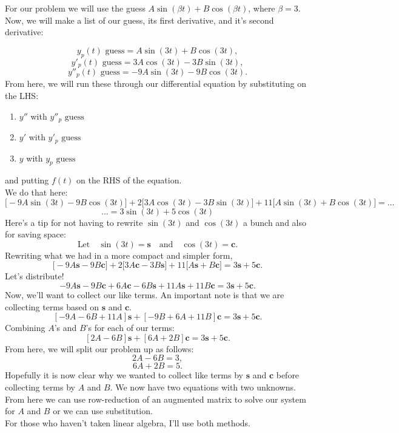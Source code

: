 \documentclass[a4paper,12pt]{article} %
\begin{document}
For our problem we will use the guess $A\sin(\beta t) + B\cos(\beta t)$, where $\beta = 3.$\\
Now, we will make a list of our guess, its first derivative, and it's second derivative:

$$ y_p(t) \text{ guess} = A\sin(3t) + B\cos(3t), $$
$$ y'_p(t) \text{ guess} = 3A\cos(3t) - 3B\sin(3t), $$
$$ y''_p(t) \text{ guess} = -9A\sin(3t) - 9B\cos(3t). $$
From here, we will run these through our differential equation by substituting on the LHS:
\begin{enumerate}
	\item $y''$ with $y''_p\text{ guess}$
	\item $y'$ with $y'_p\text{ guess}$
	\item $y$ with $y_p\text{ guess}$
\end{enumerate}
and putting $f(t)$ on the RHS of the equation.\\

We do that here:
$$ \bigg[-9A\sin(3t) - 9B\cos(3t)\bigg] + 2\bigg[3A\cos(3t) - 3B\sin(3t)\bigg] + 11\bigg[A\sin(3t) + B\cos(3t)\bigg] = \ldots$$
$$...= 3\sin(3t) + 5\cos(3t)$$
Here's a tip for not having to rewrite $\sin{(3t)}$ and $\cos{(3t)}$ a bunch and also for saving space: 
$$\text{Let}\quad\sin{(3t)} = \mathbf{s} \quad\text{and}\quad \cos{(3t)} = \mathbf{c}.$$
Rewriting what we had in a more compact and simpler form,
$$ \big[-9A\mathbf{s} - 9B\mathbf{c}\big] + 2\big[3A\mathbf{c} - 3B\mathbf{s}\big] + 11\big[A\mathbf{s} + B\mathbf{c} \big] = 3\mathbf{s} + 5\mathbf{c}. $$
Let's distribute!
$$ -9A\mathbf s - 9B\mathbf c + 6A\mathbf c - 6B\mathbf s + 11A\mathbf s + 11B\mathbf c = 3\mathbf s + 5 \mathbf c . $$
Now, we'll want to collect our like terms. An important note is that we are collecting terms based on $\mathbf s$ and $\mathbf c$.
$$ [-9A-6B + 11A]\mathbf{s} + [-9B + 6A + 11B]\mathbf{c}  = 3\mathbf{s} + 5\mathbf{c}.$$
Combining $A$'s and $B$'s for each of our terms:
$$ [2A - 6B]\mathbf{s} + [6A + 2B]\mathbf{c} = 3\mathbf{s} + 5\mathbf{c}. $$
From here, we will split our problem up as follows:
$$ 2A - 6B = 3, $$
$$ 6A + 2B = 5. $$
Hopefully it is now clear why we wanted to collect like terms by $\mathbf{s}$ and $\mathbf{c}$ before collecting terms by $A$ and $B$. We now have two equations with two unknowns.\\

From here we can use row-reduction of an augmented matrix to solve our system for $A$ and $B$ or we can use substitution.\\
For those who haven't taken linear algebra, I'll use both methods.
\end{document}
